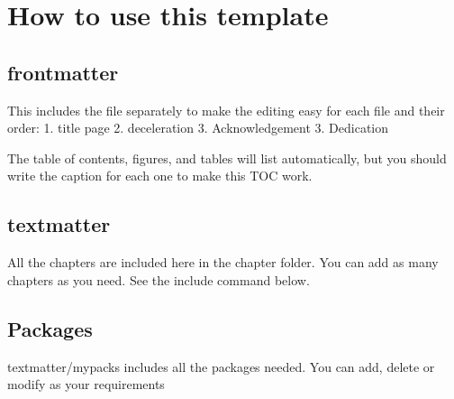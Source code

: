 \documentclass[a4paper,oneside,12pt]{report}
\author{Your name}
\begin{document}
\newpage
{}
\newpage
\newpage


\hypersetup{hidelinks}
\tableofcontents            %
\listoffigures              %
\listoftables               %
\pagebreak



\chapter{How to use this template}  %

\section{frontmatter}
This includes the file separately to make the editing easy for each file and their order:
1. title page
2. deceleration
3. Acknowledgement
3. Dedication

The table of contents, figures, and tables will list automatically, but you should write the caption for each one to make this TOC work.

\section{textmatter}
All the chapters are included here in the chapter folder. You can add as many chapters as you need. See the include command below.


\section{Packages}
textmatter/mypacks includes all the packages needed. You can add, delete or modify as your requirements
\end{document}

